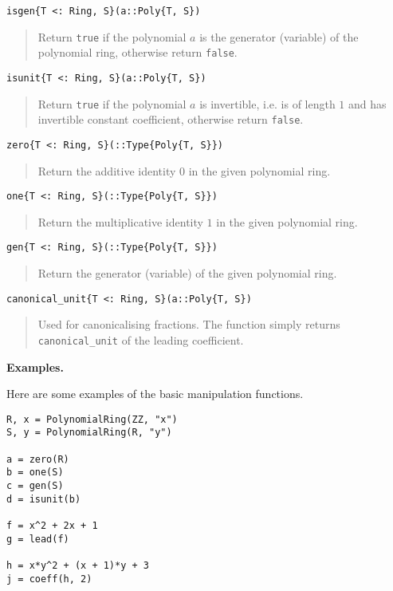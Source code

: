\documentclass[a4paper,10pt]{article}
\newcommand{\code}{\lstinline}
\newcommand{\desc}[1]{\vspace{-3mm}\begin{quote}#1\end{quote}}
\begin{document}
{{{\begin{lstlisting}
isgen{T <: Ring, S}(a::Poly{T, S})
\end{lstlisting}

\desc{Return \code{true} if the polynomial $a$ is the generator (variable) of the
polynomial ring, otherwise return \code{false}.}

\begin{lstlisting}
isunit{T <: Ring, S}(a::Poly{T, S})
\end{lstlisting}

\desc{Return \code{true} if the polynomial $a$ is invertible, i.e. is of length
$1$ and has invertible constant coefficient, otherwise return \code{false}.}

\begin{lstlisting}
zero{T <: Ring, S}(::Type{Poly{T, S}})
\end{lstlisting}

\desc{Return the additive identity $0$ in the given polynomial ring.}

\begin{lstlisting}
one{T <: Ring, S}(::Type{Poly{T, S}})
\end{lstlisting}

\desc{Return the multiplicative identity $1$ in the given polynomial ring.}

\begin{lstlisting}
gen{T <: Ring, S}(::Type{Poly{T, S}})
\end{lstlisting}

\desc{Return the generator (variable) of the given polynomial ring.}

\begin{lstlisting}
canonical_unit{T <: Ring, S}(a::Poly{T, S})
\end{lstlisting}

\desc{Used for canonicalising fractions. The function simply returns
\code{canonical_unit} of the leading coefficient.}

\textbf{Examples.}

Here are some examples of the basic manipulation functions.

\begin{lstlisting}
R, x = PolynomialRing(ZZ, "x")
S, y = PolynomialRing(R, "y")

a = zero(R)
b = one(S)
c = gen(S)
d = isunit(b)

f = x^2 + 2x + 1
g = lead(f)

h = x*y^2 + (x + 1)*y + 3
j = coeff(h, 2)


\end{lstlisting}}}}
\end{document}
